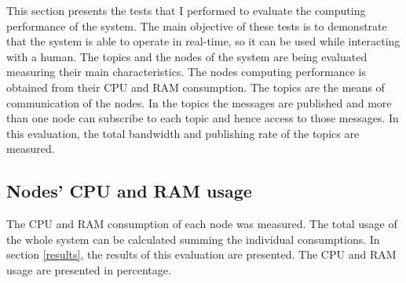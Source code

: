 	This section presents the tests that I performed to evaluate the computing performance of the system. 
	The main objective of these tests is to demonstrate that the system is able to operate in real-time, so it can be used while interacting with a human.
	The topics and the nodes of the system are being evaluated measuring their main characteristics. 
	The nodes computing performance is obtained from their CPU and RAM consumption. 
	The topics are the means of communication of the nodes. 
	In the topics the messages are published and more than one node can subscribe to each topic and hence access to those messages. 
	In this evaluation, the total bandwidth and publishing rate of the topics are measured. 

		\subsection{Nodes' CPU and RAM usage}

		The CPU and RAM consumption of each node was measured. 
		The total usage of the whole system can be calculated summing the individual consumptions. 
		In section \ref{results}, the results of this evaluation are presented. 
		The CPU and RAM usage are presented in percentage. 


